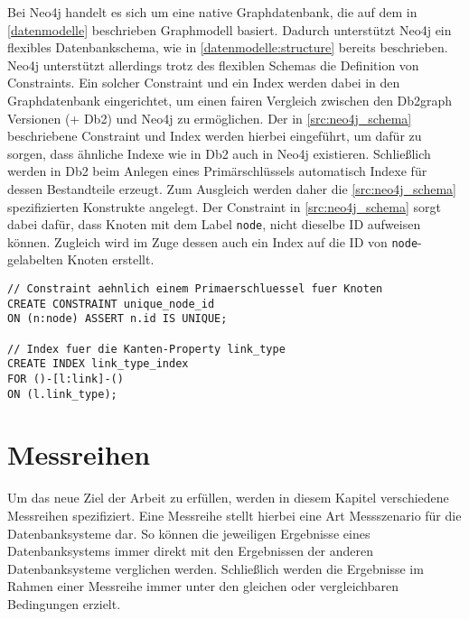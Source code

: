 Bei Neo4j handelt es sich um eine native Graphdatenbank, die auf dem in \autoref{datenmodelle} beschrieben Graphmodell basiert. Dadurch unterstützt Neo4j ein flexibles Datenbankschema, wie in \autoref{datenmodelle:structure} bereits beschrieben. Neo4j unterstützt allerdings trotz des flexiblen Schemas die Definition von Constraints. Ein solcher Constraint und ein Index werden dabei in den Graphdatenbank eingerichtet, um einen fairen Vergleich zwischen den Db2graph Versionen (+ Db2) und Neo4j zu ermöglichen. Der in \autoref{src:neo4j_schema} beschriebene Constraint und Index werden hierbei eingeführt, um dafür zu sorgen, dass ähnliche Indexe wie in Db2 auch in Neo4j existieren. Schließlich werden in Db2 beim Anlegen eines Primärschlüssels automatisch Indexe für dessen Bestandteile erzeugt. Zum Ausgleich werden daher die \autoref{src:neo4j_schema} spezifizierten Konstrukte angelegt. Der Constraint in \autoref{src:neo4j_schema} sorgt dabei dafür, dass Knoten mit dem Label \texttt{node}, nicht dieselbe ID aufweisen können. Zugleich wird im Zuge dessen auch ein Index auf die ID von \texttt{node}-gelabelten Knoten erstellt.

\begin{lstlisting}[label=src:neo4j_schema,caption={Neo4j Instanz Datenbankschema},language=CQL]
// Constraint aehnlich einem Primaerschluessel fuer Knoten
CREATE CONSTRAINT unique_node_id 
ON (n:node) ASSERT n.id IS UNIQUE;

// Index fuer die Kanten-Property link_type
CREATE INDEX link_type_index 
FOR ()-[l:link]-() 
ON (l.link_type);
\end{lstlisting}

\section{Messreihen}
\label{analyse:messreihen}
Um das neue Ziel der Arbeit zu erfüllen, werden in diesem Kapitel verschiedene Messreihen spezifiziert. Eine Messreihe stellt hierbei eine Art Messszenario für die Datenbanksysteme dar. So können die jeweiligen Ergebnisse eines Datenbanksystems immer direkt mit den Ergebnissen der anderen Datenbanksysteme verglichen werden. Schließlich werden die Ergebnisse im Rahmen einer Messreihe immer unter den gleichen oder vergleichbaren Bedingungen erzielt. 

